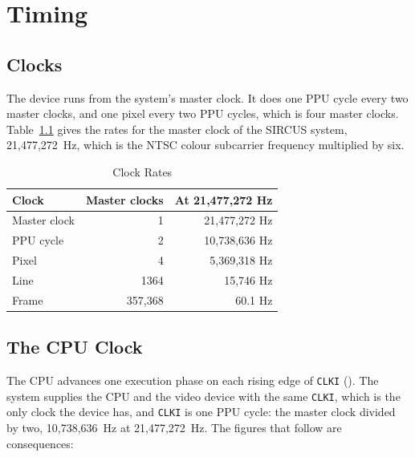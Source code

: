 \chapter{Timing}
\label{ch:timing}

\section{Clocks}

The device runs from the system's master clock. It does one PPU cycle every two master clocks, and one pixel every two
PPU cycles, which is four master clocks. Table~\ref{tab:clocks} gives the rates for the master clock of the SIRCUS
system, 21,477,272~Hz, which is the NTSC colour subcarrier frequency multiplied by six.

\begin{table}[H]
	\centering
	\begin{tabular}{lrr}
		\toprule
		\textbf{Clock} & \textbf{Master clocks} & \textbf{At 21,477,272 Hz} \\
		\midrule
		Master clock   & 1                      & 21,477,272 Hz             \\
		PPU cycle      & 2                      & 10,738,636 Hz             \\
		Pixel          & 4                      & 5,369,318 Hz              \\
		Line           & 1364                   & 15,746 Hz                 \\
		Frame          & 357,368                & 60.1 Hz                   \\
		\bottomrule
	\end{tabular}
	\caption{Clock Rates}
	\label{tab:clocks}
\end{table}

\section{The CPU Clock}
\label{sec:cpu-clock}

The CPU advances one execution phase on each rising edge of \texttt{CLKI} (\hwmanual{}). The system supplies the CPU
and the video device with the same \texttt{CLKI}, which is the only clock the device has, and \texttt{CLKI} is one PPU
cycle: the master clock divided by two, 10,738,636~Hz at 21,477,272~Hz. The figures that follow are consequences:

